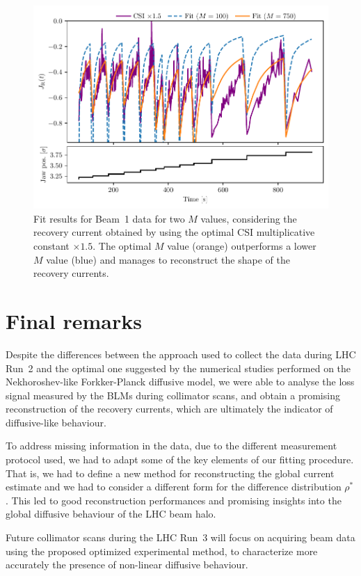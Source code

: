 \begin{figure}[t]
    \centering
    \includegraphics[trim={0 2.5mm 0 3mm}, clip, width=0.95\columnwidth]{5_Diffusion_measurement_LHC/figs/fifth.pdf}
    \caption{Fit results for Beam~1 data for two $M$ values, considering the recovery current obtained by using the optimal CSI multiplicative constant $\times 1.5$. The optimal $M$ value (orange) outperforms a lower $M$ value (blue) and manages to reconstruct the shape of the recovery currents.}
    \label{fig:fifth}
\end{figure}
%
\section{Final remarks}\label{sec:4:remarks}
%
Despite the differences between the approach used to collect the data during LHC Run~2 and the optimal one suggested by the numerical studies performed on the Nekhoroshev-like Forkker-Planck diffusive model, we were able to analyse the loss signal measured by the BLMs during collimator scans, and obtain a promising reconstruction of the recovery currents, which are ultimately the indicator of diffusive-like behaviour.

To address missing information in the data, due to the different measurement protocol used, we had to adapt some of the key elements of our fitting procedure. That is, we had to define a new method for reconstructing the global current estimate and we had to consider a different form for the difference distribution $\rho^\ast$. This led to good reconstruction performances and promising insights into the global diffusive behaviour of the LHC beam halo.

Future collimator scans during the LHC Run~3 will focus on acquiring beam data using the proposed optimized experimental method, to characterize more accurately the presence of non-linear diffusive behaviour. 
